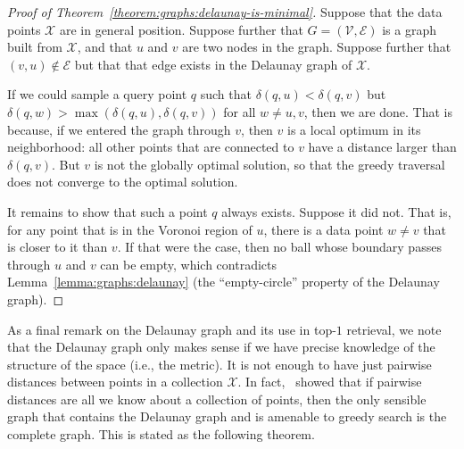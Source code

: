 \begin{proof}[Proof of Theorem~\ref{theorem:graphs:delaunay-is-minimal}]
    Suppose that the data points $\mathcal{X}$ are in general position.
    Suppose further that $G = (\mathcal{V}, \mathcal{E})$ is a graph built from $\mathcal{X}$,
    and that $u$ and $v$ are two nodes in the graph.
    Suppose further that $(v, u) \notin \mathcal{E}$ but that that edge
    exists in the Delaunay graph of $\mathcal{X}$.

    If we could sample a query point $q$ such that
    $\delta(q, u) < \delta(q, v)$ but 
    $\delta(q, w) > \max(\delta(q, u), \delta(q, v))$ for all $w \neq u, v$,
    then we are done.
    That is because, if we entered the graph through $v$, then $v$ is a local optimum
    in its neighborhood: all other points that are connected to $v$ have a distance larger than $\delta(q, v)$.
    But $v$ is not the globally optimal solution, so that the greedy traversal does not converge to the
    optimal solution.

    It remains to show that such a point $q$ always exists.
    Suppose it did not. That is, for any point that is in the Voronoi region of $u$,
    there is a data point $w \neq v$ that is closer to it than $v$.
    If that were the case, then no ball whose boundary passes through $u$ and $v$
    can be empty, which contradicts Lemma~\ref{lemma:graphs:delaunay} (the ``empty-circle''
    property of the Delaunay graph).
\end{proof}

As a final remark on the Delaunay graph and its use in top-$1$ retrieval, we note that
the Delaunay graph only makes sense if we have precise knowledge of the structure of the space
(i.e., the metric). It is not enough to have just pairwise distances between points in a collection
$\mathcal{X}$. In fact,~\cite{navarro2002spatial-approximateion} showed that if pairwise
distances are all we know about a collection of points, then the only sensible
graph that contains the Delaunay graph and is amenable to greedy search is the complete graph.
This is stated as the following theorem.

